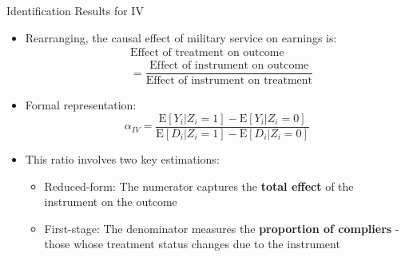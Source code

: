\documentclass[dvipsnames,hyperref={pdfpagelabels=false}]{beamer}
\begin{document}
\begin{frame}{Identification Results for IV}
	\begin{itemize}
		
		\item Rearranging, the causal effect of military service on earnings is:
		\begin{equation*}
			\begin{aligned}
				& \text{Effect of treatment on outcome} \\ 
				&= \dfrac{\text{Effect of instrument on outcome}}{\text{Effect of instrument on treatment}}
			\end{aligned}
		\end{equation*}
		\item Formal representation:
		\begin{equation*}
			\alpha_{IV}=\dfrac{\mathrm{E}[Y_{i}|Z_{i}=1]-\mathrm{E}[Y_{i}|Z_{i}=0]}{\mathrm{E}[D_{i}|Z_{i}=1]-\mathrm{E}[D_{i}|Z_{i}=0]}
		\end{equation*} 
		
		\item This ratio involves two key estimations:
				\vspace{0.2cm}
		\begin{itemize}
			\item Reduced-form: The numerator captures the \textbf{total effect} of the instrument on the outcome
					\vspace{0.2cm}
			\item  First-stage: The denominator measures the \textbf{proportion of compliers} - those whose treatment status changes due to the instrument
					\vspace{0.2cm}
		\end{itemize}
		
		
	\end{itemize}
\end{frame}
\end{document}
